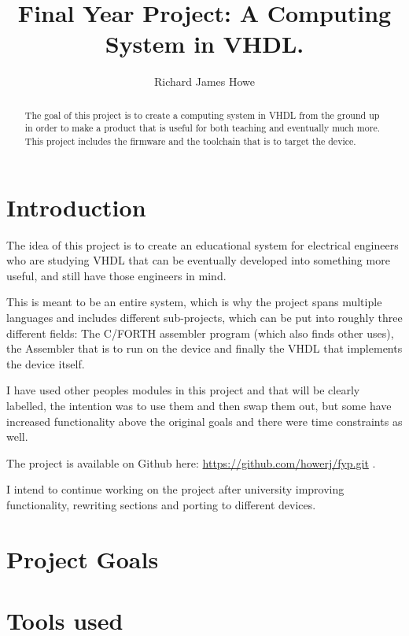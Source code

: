 \documentclass	[a4paper, 10pt]	{article}
\title		{Final Year Project: A Computing System in VHDL.}
\author		{Richard James Howe}
\begin{document}
	\maketitle
	\hrulefill

	\begin{abstract}
    The goal of this project is to create a computing system in VHDL from the
    ground up in order to make a product that is useful for both teaching and
    eventually much more. This project includes the firmware and the toolchain
    that is to target the device.
	\end{abstract}

	\tableofcontents
  \listoffigures

  \section{Introduction}

  The idea of this project is to create an educational system for electrical
  engineers who are studying VHDL that can be eventually developed into something 
  more useful, and still have those engineers in mind. 

  This is meant to be an entire system, which is why the project spans multiple
  languages and includes different sub-projects, which can be put into roughly
  three different fields: The C/FORTH assembler program (which also finds other
  uses), the Assembler that is to run on the device and finally the VHDL that implements
  the device itself.

  I have used other peoples modules in this project and that will be clearly labelled,
  the intention was to use them and then swap them out, but some have increased
  functionality above the original goals and there were time constraints as well.

  The project is available on Github here: \url{https://github.com/howerj/fyp.git} .

  I intend to continue working on the project after university improving functionality,
  rewriting sections and porting to different devices.

  \section{Project Goals}

  \section{Tools used}
  
\end{document}
